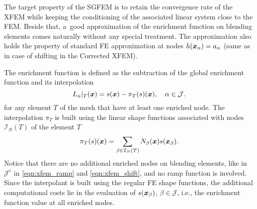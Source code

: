 The target property of the SGFEM is to retain the convergence rate of the XFEM while keeping the conditioning of the associated linear system
close to the FEM. Beside that, a~good approximation of the enrichment function on blending elements comes naturally without any special treatment.
The approximation also holds the property of standard FE approximation at nodes $h(\mathbf{\boldsymbol{x}}_\alpha)=a_\alpha$ (same as in case of shifting in the Corrected XFEM).

The enrichment function is defined as the subtraction of the global enrichment function and its interpolation
\begin{equation} \label{eqn:sgfem_enrich}
    L_{\alpha}|_{T}(\mathbf{\boldsymbol{x}}) = s(\mathbf{\boldsymbol{x}}) - \pi_T (s)(\mathbf{\boldsymbol{x}}),
    \quad \alpha\in\mathcal{J}.
\end{equation} 
for any element $T$ of the mesh that have at least one enriched node.
The interpolation $\pi_T$ is built using the linear shape functions
associated with nodes $\mathcal{I}_N(T)$ of the element $T$
\begin{equation} \label{eqn:sgfem_interpolation}
    \pi_T (s)(\mathbf{\boldsymbol{x}}) = \sum_{\beta\in\mathcal{I}_N(T)} N_\beta(\mathbf{\boldsymbol{x}}) s(\mathbf{\boldsymbol{x}}_\beta).
\end{equation}
Notice that there are no additional enriched nodes on blending elements, like in $\mathcal{J}^e$ in 
\eqref{eqn:xfem_ramp} and \eqref{eqn:xfem_shift}, and no ramp function is involved.
Since the interpolant is built using the regular FE shape functions, the additional computational costs lie in the evaluation of $s(\mathbf{\boldsymbol{x}}_\beta)$, $\beta\in\mathcal{J}$,
i.e., the enrichment function value at all enriched nodes.

